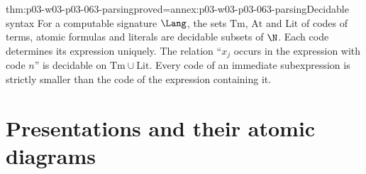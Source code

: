 \begin{hblemma}{thm:p03-w03-p03-063-parsing}{proved=annex:p03-w03-p03-063-parsing}{Decidable syntax}
For a computable signature \(\Lang\), the sets \(\mathrm{Tm}\),
\(\mathrm{At}\) and \(\mathrm{Lit}\) of codes of terms, atomic formulas and
literals are decidable subsets of \(\N\).  Each code determines its
expression uniquely.  The relation ``\(x_j\) occurs in the expression with
code \(n\)'' is decidable on \(\mathrm{Tm}\cup\mathrm{Lit}\).  Every code of
an immediate subexpression is strictly smaller than the code of the
expression containing it.
\end{hblemma}

\section{Presentations and their atomic diagrams}
\label{sec:p03-w03-p03-063-presentations}

